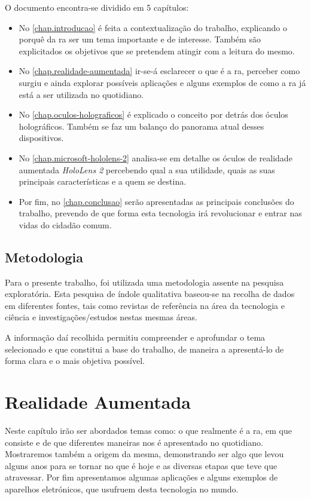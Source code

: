 \documentclass{report}
\begin{document}
O documento encontra-se dividido em 5 capítulos:
\begin{itemize}
    \item No \autoref{chap.introducao} é feita a contextualização do trabalho, explicando o porquê da \ac{ra} ser um tema importante e de interesse. Também são explicitados os objetivos que se pretendem atingir com a leitura do mesmo.
    \item No \autoref{chap.realidade-aumentada} ir-se-á esclarecer o que é a \ac{ra}, perceber como surgiu e ainda explorar possíveis aplicações e alguns exemplos de como a \ac{ra} já está a ser utilizada no quotidiano.
    \item No \autoref{chap.oculos-holograficos} é explicado o conceito por detrás dos óculos holográficos. Também se faz um balanço do panorama atual desses dispositivos.
    \item No \autoref{chap.microsoft-hololens-2} analisa-se em detalhe os óculos de realidade aumentada \textit{HoloLens 2} percebendo qual a sua utilidade, quais as suas principais características e a quem se destina.
    \item Por fim, no \autoref{chap.conclusao} serão apresentadas as principais conclusões do trabalho, prevendo de que forma esta tecnologia irá revolucionar e entrar nas vidas do cidadão comum.
\end{itemize}

\section{Metodologia}
Para o presente trabalho, foi utilizada uma metodologia assente na pesquisa exploratória. Esta pesquisa de índole qualitativa baseou-se na recolha de dados em diferentes fontes, tais como revistas de referência na área da tecnologia e ciência e investigações/estudos nestas mesmas áreas.

A informação daí recolhida permitiu compreender e aprofundar o tema selecionado e que constitui a base do trabalho, de maneira a apresentá-lo de forma clara e o mais objetiva possível.

\chapter{Realidade Aumentada}
\label{chap.realidade-aumentada}
Neste capítulo irão ser abordados temas como: o que realmente é a \ac{ra}, em que consiste e de que diferentes maneiras nos é apresentado no quotidiano. Mostraremos também a origem da mesma, demonstrando ser algo que levou alguns anos para se tornar no que é hoje e as diversas etapas que teve que atravessar. Por fim apresentamos algumas aplicações e alguns exemplos de aparelhos eletrónicos, que usufruem desta tecnologia no mundo.
\end{document}
